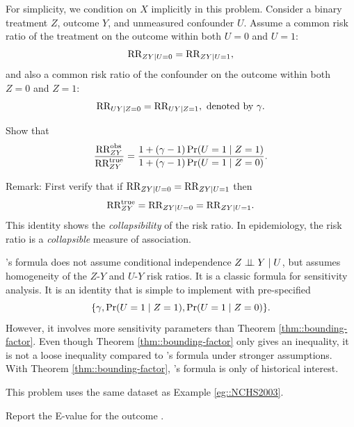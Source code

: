 \begin{HomeworkProblem}\label{exr:17-4}

For simplicity, we condition on $X$ implicitly in this problem.
Consider a binary treatment $Z$, outcome $Y$, and unmeasured confounder $U$.
Assume a common risk ratio of the treatment on the outcome within both $U=0$ and $U=1$:
\[
 \text{RR}_{ZY|U=0} = \text{RR}_{ZY|U=1},
\]
and also a common risk ratio of the confounder on the outcome within both $Z=0$ and $Z=1$:
\[
\text{RR}_{UY|Z=0} = \text{RR}_{UY|Z=1} , \text{ denoted by }\gamma.
\]

Show that
\[
\frac{\text{RR}_{ZY}^{\textup{obs}}}{  \text{RR}_{ZY}^{\textup{true}} } = \frac{1 + (  \gamma  -1)\operatorname{Pr}(U=1\mid Z=1)  }
{ 1 + (  \gamma -1)\operatorname{Pr}(U=1\mid Z=0) } .
\]




Remark: First verify that if  $\text{RR}_{ZY|U=0} = \text{RR}_{ZY|U=1}$ then
\[
\text{RR}_{ZY}^{\textup{true}}  = \text{RR}_{ZY|U=0} = \text{RR}_{ZY|U=1} .
\]
This identity shows the {\it collapsibility} of the risk ratio.
In epidemiology, the risk ratio is a {\it collapsible} measure of association.



\citet{Schlesselman::1978}'s formula does not assume conditional independence $Z\mathrel{\perp\!\!\!\perp} Y\mid U$, but assumes homogeneity of the $Z$-$Y$ and $U$-$Y$ risk ratios. It is a classic formula for sensitivity analysis. It is an identity that is simple to implement with pre-specified
\[
\{   \gamma  ,  \operatorname{Pr}(U=1\mid Z=1), \operatorname{Pr}(U=1\mid Z=0)  \} .
\]
However, it involves more sensitivity parameters than Theorem \ref{thm::bounding-factor}. Even though Theorem \ref{thm::bounding-factor} only gives an inequality, it is not a loose inequality compared to \citet{Schlesselman::1978}'s formula under stronger assumptions. With Theorem \ref{thm::bounding-factor},  \citet{Schlesselman::1978}'s formula is only of historical interest.




\end{HomeworkProblem}

\begin{HomeworkProblem}\label{exr:17-5}

This problem uses the same dataset as Example \ref{eg::NCHS2003}.

Report the E-value for the outcome .


\end{HomeworkProblem}


